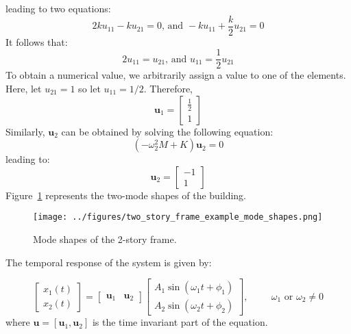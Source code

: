 \documentclass[12pt,letter]{article}
\begin{document}
\begin{example}
\begin{equation}
\end{equation}
leading to two equations:
\begin{equation}
2 k u_{11} -k u_{21}=0 \text{, and } -k u_{11} + \frac{k}{2} u_{21}=0
\end{equation}
It follows that:
\begin{equation}
2 u_{11}= u_{21}  \text{, and } u_{11} = \frac{1}{2}u_{21}
\end{equation}
To obtain a numerical value, we arbitrarily assign a value to one of the elements. Here, let $u_{21}=1$ so let $u_{11}=1/2$. Therefore, 
\begin{equation}
\textbf{u}_1 = \begin{bmatrix} \frac{1}{2}\\ 1\end{bmatrix}
\end{equation}
Similarly, $\mathbf{u}_2$ can be obtained by solving the following equation:
\begin{equation}
(-\omega_2^2 M  + K)\mathbf{u}_2 =0
\end{equation}
leading to:
\begin{equation}
	\textbf{u}_2 = \begin{bmatrix} -1\\ 1\end{bmatrix}
\end{equation}
Figure~\ref{fig:modeshapes} represents the two-mode shapes of the building. 



\begin{figure}[H]
	\centering
	\texttt{[image: ../figures/two\_story\_frame\_example\_mode\_shapes.png]}
	\caption{Mode shapes of the 2-story frame.}
	\label{fig:modeshapes}
\end{figure}




The temporal response of the system is given by:

\begin{equation}
\begin{bmatrix} x_1(t) \\  x_2(t) \end{bmatrix} =  \begin{bmatrix} \mathbf{u}_1 & \mathbf{u}_2 \end{bmatrix}
\begin{bmatrix} A_1 \sin (\omega_1 t + \phi_1 )\\ A_2 \sin (\omega_2 t + \phi_2 )\end{bmatrix}, \hspace{1cm} \omega_1 \text{ or } \omega_2 \neq 0
\end{equation}
where $\mathbf{u} = [\mathbf{u}_1, \mathbf{u}_2]$ is the time invariant part of the equation. 


\end{example}
		

		
		
		
\end{document}
